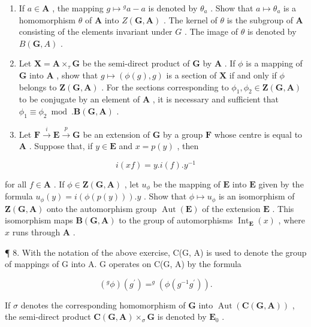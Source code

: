\begin{enumerate}
\def\labelenumi{(\alph{enumi})}
\item
  If \(a \in \mathbf{A}\) , the mapping \(g \mapsto {}^g a - a\) is denoted by \(\theta_a\) . Show that \(a \mapsto \theta_a\) is a homomorphism \(\theta\) of \(\mathbf{A}\) into \(Z(\mathbf{G}, \mathbf{A})\) . The kernel of \(\theta\) is the subgroup of \(\mathbf{A}\) consisting of the elements invariant under \(G\) . The image of \(\theta\) is denoted by \(B(\mathbf{G}, A)\) .
\item
  Let \(\mathbf{X} = \mathbf{A} \times_{\tau} \mathbf{G}\) be the semi-direct product of \(\mathbf{G}\) by \(\mathbf{A}\) . If \(\phi\) is a mapping of \(\mathbf{G}\) into \(\mathbf{A}\) , show that \(g \mapsto (\phi(g), g)\) is a section of \(\mathbf{X}\) if and only if \(\phi\) belongs to \(\mathbf{Z}(\mathbf{G}, \mathbf{A})\) . For the sections corresponding to \(\phi_1, \phi_2 \in \mathbf{Z}(\mathbf{G}, \mathbf{A})\) to be conjugate by an element of \(\mathbf{A}\) , it is necessary and sufficient that \(\phi_1 \equiv \phi_2 \bmod. \mathbf{B}(\mathbf{G}, \mathbf{A})\) .
\item
  Let \(\mathbf{F} \xrightarrow{i} \mathbf{E} \xrightarrow{p} \mathbf{G}\) be an extension of \(\mathbf{G}\) by a group \(\mathbf{F}\) whose centre is equal to \(\mathbf{A}\) . Suppose that, if \(y \in \mathbf{E}\) and \(x = p(y)\) , then
\end{enumerate}

\[
i (x f) = y. i (f). y ^ {- 1}
\]

for all \(f \in \mathbf{A}\) . If \(\phi \in \mathbf{Z}(\mathbf{G}, \mathbf{A})\) , let \(u_{\phi}\) be the mapping of \(\mathbf{E}\) into \(\mathbf{E}\) given by the formula \(u_{\phi}(y) = i(\phi(p(y))) .y\) . Show that \(\phi \mapsto u_{\phi}\) is an isomorphism of \(\mathbf{Z}(\mathbf{G}, \mathbf{A})\) onto the automorphism group \(\operatorname{Aut}(\mathbf{E})\) of the extension \(\mathbf{E}\) . This isomorphism maps \(\mathbf{B}(\mathbf{G}, \mathbf{A})\) to the group of automorphisms \(\operatorname{Int}_{\mathbf{E}}(x)\) , where \(x\) runs through \(\mathbf{A}\) .

¶ 8. With the notation of the above exercise, C(G, A) is used to denote the group of mappings of G into A. G operates on C(G, A) by the formula

\[
\left(^ {g} \phi\right) \left(g ^ {\prime}\right) = ^ {g} \left(\phi \left(g ^ {- 1} g ^ {\prime}\right)\right).
\]

If \(\sigma\) denotes the corresponding homomorphism of \(\mathbf{G}\) into \(\operatorname{Aut}(\mathbf{C}(\mathbf{G},\mathbf{A}))\) , the semi-direct product \(\mathbf{C}(\mathbf{G},\mathbf{A}) \times_{\sigma} \mathbf{G}\) is denoted by \(\mathbf{E}_0\) .

